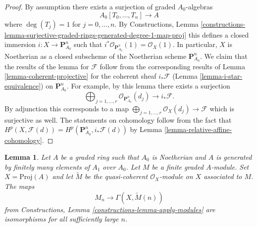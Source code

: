 \documentclass{stacks-project}
\theoremstyle{plain}
\newtheorem{lemma}[subsection]{Lemma}
\theoremstyle{definition}
\theoremstyle{remark}
\numberwithin{equation}{subsection}
\begin{document}
\begin{proof}
By assumption there exists a surjection of graded $A_0$-algebras
$$
A_0[T_0, \ldots, T_n] \longrightarrow A
$$
where $\deg(T_j) = 1$ for $j = 0, \ldots, n$. By Constructions, Lemma
\ref{constructions-lemma-surjective-graded-rings-generated-degree-1-map-proj}
this defines a closed immersion $i : X \to \mathbf{P}^n_{A_0}$
such that $i^*\mathcal{O}_{\mathbf{P}^n_{A_0}}(1) = \mathcal{O}_X(1)$.
In particular, $X$ is Noetherian as a closed subscheme of the Noetherian
scheme $\mathbf{P}^n_{A_0}$. We claim that the results of the lemma for
$\mathcal{F}$ follow from the corresponding
results of Lemma \ref{lemma-coherent-projective} for the coherent sheaf
$i_*\mathcal{F}$ (Lemma \ref{lemma-i-star-equivalence}) on
$\mathbf{P}^n_{A_0}$. For example, by this lemma there
exists a surjection
$$
\bigoplus\nolimits_{j = 1, \ldots, r} \mathcal{O}_{\mathbf{P}^n_{A_0}}(d_j)
\longrightarrow i_*\mathcal{F}.
$$
By adjunction this corresponds to a map
$\bigoplus_{j = 1, \ldots, r} \mathcal{O}_X(d_j) \longrightarrow \mathcal{F}$
which is surjective as well. The statements on cohomology follow from the
fact that
$H^p(X, \mathcal{F}(d)) = H^p(\mathbf{P}^n_{A_0}, i_*\mathcal{F}(d))$
by Lemma \ref{lemma-relative-affine-cohomology}.
\end{proof}

\begin{lemma}
\label{lemma-recover-tail-graded-module}
Let $A$ be a graded ring such that $A_0$ is Noetherian and $A$ is generated
by finitely many elements of $A_1$ over $A_0$. Let $M$ be a
finite graded $A$-module. Set $X = \text{Proj}(A)$ and let $\widetilde{M}$
be the quasi-coherent $\mathcal{O}_X$-module on $X$ associated to $M$.
The maps
$$
M_n \longrightarrow \Gamma(X, \widetilde{M}(n))
$$
from Constructions, Lemma \ref{constructions-lemma-apply-modules}
are isomorphisms for all sufficiently large $n$.
\end{lemma}
\end{document}
